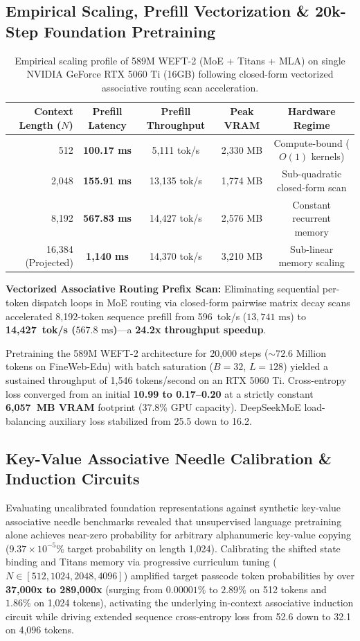 \documentclass[11pt,a4paper]{article}
\begin{document}
\subsection{Empirical Scaling, Prefill Vectorization \& 20k-Step Foundation Pretraining}
\begin{table}[h]
\centering
\begin{tabular}{rcccc}
\toprule
\textbf{Context Length ($N$)} & \textbf{Prefill Latency} & \textbf{Prefill Throughput} & \textbf{Peak VRAM} & \textbf{Hardware Regime} \\
\midrule
512 & \textbf{100.17 ms} & 5,111 tok/s & 2,330 MB & Compute-bound ($O(1)$ kernels) \\
2,048 & \textbf{155.91 ms} & 13,135 tok/s & 1,774 MB & Sub-quadratic closed-form scan \\
8,192 & \textbf{567.83 ms} & 14,427 tok/s & 2,576 MB & Constant recurrent memory \\
16,384 (Projected) & \textbf{1,140 ms} & 14,370 tok/s & 3,210 MB & Sub-linear memory scaling \\
\bottomrule
\end{tabular}
\caption{Empirical scaling profile of 589M WEFT-2 (MoE + Titans + MLA) on single NVIDIA GeForce RTX 5060 Ti (16GB) following closed-form vectorized associative routing scan acceleration.}
\end{table}

\noindent \textbf{Vectorized Associative Routing Prefix Scan:} Eliminating sequential per-token dispatch loops in MoE routing via closed-form pairwise matrix decay scans accelerated 8,192-token sequence prefill from 596~tok/s ($13{,}741\text{~ms}$) to \textbf{14,427~tok/s ($567.8\text{~ms}$)}---a \textbf{24.2x throughput speedup}.

Pretraining the 589M WEFT-2 architecture for 20,000 steps ($\sim 72.6$ Million tokens on FineWeb-Edu) with batch saturation ($B=32$, $L=128$) yielded a sustained throughput of 1,546 tokens/second on an RTX 5060 Ti. Cross-entropy loss converged from an initial \textbf{10.99 to 0.17--0.20} at a strictly constant \textbf{6,057~MB VRAM} footprint (37.8\% GPU capacity). DeepSeekMoE load-balancing auxiliary loss stabilized from 25.5 down to 16.2.

\subsection{Key-Value Associative Needle Calibration \& Induction Circuits}
Evaluating uncalibrated foundation representations against synthetic key-value associative needle benchmarks revealed that unsupervised language pretraining alone achieves near-zero probability for arbitrary alphanumeric key-value copying ($9.37 \times 10^{-5}\%$ target probability on length 1,024). Calibrating the shifted state binding and Titans memory via progressive curriculum tuning ($N \in [512, 1024, 2048, 4096]$) amplified target passcode token probabilities by over \textbf{37,000x to 289,000x} (surging from $0.00001\%$ to $2.89\%$ on 512 tokens and $1.86\%$ on 1,024 tokens), activating the underlying in-context associative induction circuit while driving extended sequence cross-entropy loss from 52.6 down to 32.1 on 4,096 tokens.
\end{document}
